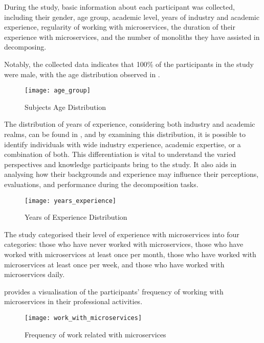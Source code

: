 During the study, basic information about each participant was collected,
including their gender, age group, academic level, years of industry and
academic experience, regularity of working with microservices, the duration of
their experience with microservices, and the number of monoliths they have
assisted in decomposing.

Notably, the collected data indicates that 100\% of the participants in the
study were male, with the age distribution observed in
.

\begin{figure*}[!htb] \caption{Subjects Age Distribution}
  \label{fig:subjects_age_distribution} \centering
  \texttt{[image: age\_group]}
\end{figure*}

The distribution of years of experience, considering both industry and academic
realms, can be found in , and by
examining this distribution, it is possible to identify individuals with
wide industry experience, academic expertise, or a combination of both. This
differentiation is vital to understand the varied perspectives and knowledge
participants bring to the study. It also aids in analysing how their
backgrounds and experience may influence their perceptions, evaluations, and
performance during the decomposition tasks.

\begin{figure*}[!htb] \caption{Years of Experience Distribution}
  \label{fig:year_experience_distribution} \centering
  \texttt{[image: years\_experience]}
\end{figure*}

The study categorised their level of experience with microservices into four
categories: those who have never worked with microservices, those who have
worked with microservices at least once per month, those who have worked with
microservices at least once per week, and those who have worked with
microservices daily.

 provides a visualisation of the
participants' frequency of working with microservices in their professional
activities.

\begin{figure*}[!htb] \caption{Frequency of work related with microservices}
  \label{fig:work_with_microservices} \centering
  \texttt{[image: work\_with\_microservices]}
\end{figure*}

